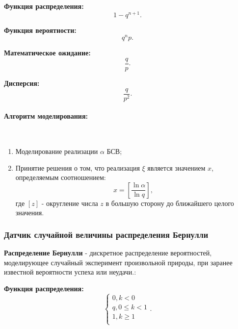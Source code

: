 \textbf{Функция распределения:}
\begin{equation}
	1 - q^{n+1}.
\end{equation}

\textbf{Функция вероятности:}
\begin{equation}
	q^{n}p.
\end{equation}

\textbf{Математическое ожидание:}
\begin{equation}
	\frac{q}{p}.
\end{equation}

\textbf{Дисперсия:}
\begin{equation}
	\frac{q}{p^{2}}.
\end{equation}

\paragraph{Алгоритм моделирования:}\
\

\begin{enumerate}
	\item Моделирование реализации $\alpha$ БСВ;
	\item Принятие решения о том, что реализация $\xi$ является значением $x$, определяемым соотношением:
	      \begin{equation}
		      x = \left[ \frac{\ln \alpha}{\ln q} \right],
	      \end{equation}
	      где $[z]$ - округление числа $z$ в большую сторону до ближайшего целого значения.
\end{enumerate}

\subsubsection{Датчик случайной величины распределения Бернулли}

\textbf{Распределение Бернулли} - дискретное распределение вероятностей, моделирующее случайный эксперимент произвольной природы, при заранее известной вероятности успеха или неудачи.:\

\textbf{Функция распределения:}
\begin{equation}
	\begin{cases}{}
		0, k < 0             \\
		q, 0 \leqslant k < 1 \\
		1, k \geqslant 1     \\
	\end{cases}.
\end{equation}

